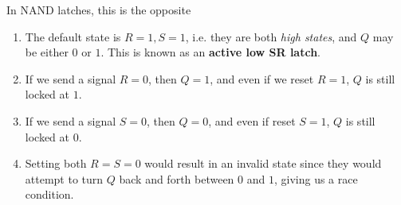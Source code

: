   \begin{theorem}
    In NAND latches, this is the opposite
    \begin{enumerate}
      \item The default state is $R = 1, S = 1$, i.e. they are both \textit{high states}, and $Q$ may be either $0$ or $1$. This is known as an \textbf{active low SR latch}.
      \item If we send a signal $R = 0$, then $Q = 1$, and even if we reset $R = 1$, $Q$ is still locked at $1$. 
      \item If we send a signal $S = 0$, then $Q = 0$, and even if reset $S = 1$, $Q$ is still locked at $0$. 
      \item Setting both $R = S = 0$ would result in an invalid state since they would attempt to turn $Q$ back and forth between $0$ and $1$, giving us a race condition. 
    \end{enumerate}

    \begin{figure}[H]
      \centering
      \begin{subfigure}[b]{0.48\textwidth}
        \centering
\end{subfigure}
\end{figure}
\end{theorem}
